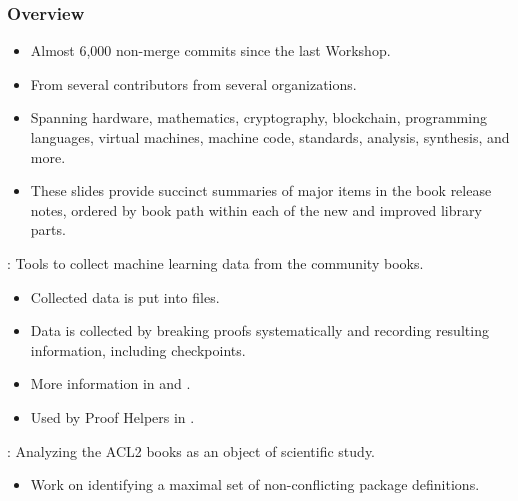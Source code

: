 

\begin{frame}

\frametitle{Overview}

\begin{itemize}
\item Almost 6,000 non-merge commits since the last Workshop.
\item From several contributors from several organizations.
\item Spanning hardware, mathematics, cryptography, blockchain,
      programming languages, virtual machines, machine code,
      standards, analysis, synthesis, and more.
\item These slides provide succinct summaries
      of major items in the book release notes,
      ordered by book path within each of the new and improved library parts.
\end{itemize}

\end{frame}


\begin{frame}

\newlibtitle

:
Tools to collect machine learning data from the community books.
\begin{itemize}
\item Collected data is put into  files.
\item Data is collected by breaking proofs systematically
      and recording resulting information, including checkpoints.
\item More information in  and  .
\item Used by Proof Helpers in .
\end{itemize}

\end{frame}


\begin{frame}

\newlibtitle

:
Analyzing the ACL2 books as an object of scientific study.
\begin{itemize}
\item Work on identifying a maximal set of non-conflicting package definitions.
\end{itemize}

\end{frame}

